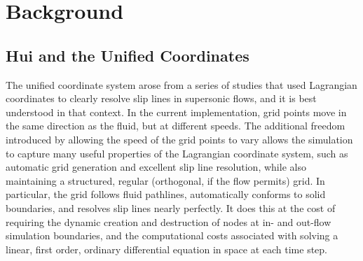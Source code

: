 \documentclass[12pt,letterpaper]{article}
\begin{document}
\section{Background}
\label{sec:background}
\subsection{Hui and the Unified Coordinates}
The unified coordinate system arose from a series of studies that 
used Lagrangian coordinates to clearly resolve slip lines in 
supersonic flows, and it is best understood in that context.
In the current implementation, 
grid points move in the same direction as the fluid, but at different
speeds. The additional freedom 
introduced by allowing the speed of the grid points to vary allows the simulation to 
capture many useful properties of the Lagrangian coordinate system,
such as automatic grid generation and excellent slip line resolution, 
while also maintaining a structured, regular (orthogonal, if the flow permits) 
grid. In particular, 
the grid follows fluid pathlines, automatically 
conforms to solid boundaries, and resolves slip lines nearly 
perfectly. It does this at the cost of requiring the dynamic creation 
and destruction of nodes at in- and out-flow simulation boundaries, 
and the computational costs associated with solving a linear, first 
order, ordinary differential equation in space at each time step. 
\end{document}
